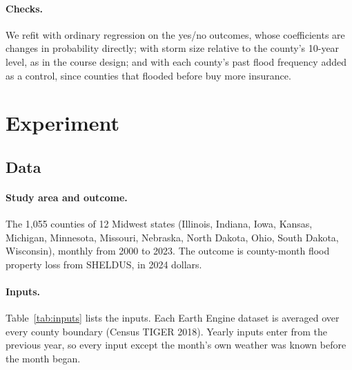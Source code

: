 \documentclass[10pt,twocolumn]{article}
\begin{document}
\paragraph{Checks.} We refit with ordinary regression on the yes/no outcomes, whose coefficients
are changes in probability directly; with storm size relative to the county's 10-year level, as
in the course design; and with each county's past flood frequency added as a control, since
counties that flooded before buy more insurance.


\section{Experiment}
\subsection{Data}

\paragraph{Study area and outcome.} The 1,055 counties of 12 Midwest states (Illinois, Indiana,
Iowa, Kansas, Michigan, Minnesota, Missouri, Nebraska, North Dakota, Ohio, South Dakota,
Wisconsin), monthly from 2000 to 2023. The outcome is county-month flood property loss from
SHELDUS, in 2024 dollars.

\paragraph{Inputs.} Table~\ref{tab:inputs} lists the inputs. Each Earth Engine dataset is
averaged over every county boundary (Census TIGER 2018). Yearly inputs enter from the previous
year, so every input except the month's own weather was known before the month began.
\end{document}
